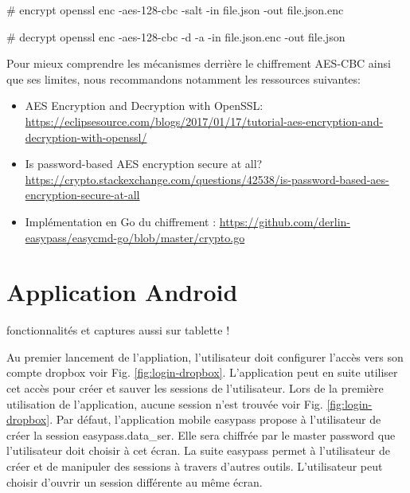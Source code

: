 \begin{bashcode}
# encrypt
openssl enc -aes-128-cbc -salt -in file.json -out file.json.enc  

# decrypt
openssl enc -aes-128-cbc -d -a -in file.json.enc -out file.json 
\end{bashcode}


Pour mieux comprendre les mécanismes derrière le chiffrement AES-CBC ainsi que ses limites, nous recommandons notamment les ressources suivantes:

\begin{itemize}
    \item AES Encryption and Decryption with OpenSSL: \url{https://eclipsesource.com/blogs/2017/01/17/tutorial-aes-encryption-and-decryption-with-openssl/}
    \item Is password-based AES encryption secure at all? \url{https://crypto.stackexchange.com/questions/42538/is-password-based-aes-encryption-secure-at-all}
    \item Implémentation en Go du chiffrement \easypass{}: \url{https://github.com/derlin-easypass/easycmd-go/blob/master/crypto.go}
\end{itemize}

\section{Application Android}

fonctionnalités et captures aussi sur tablette !

Au premier lancement de l'appliation, l'utilisateur doit configurer l'accès vers son compte dropbox voir Fig. \ref{fig:login-dropbox}. L'application peut en suite utiliser cet accès pour créer et sauver les sessions de l'utilisateur. Lors de la première utilisation de l'application, aucune session n'est trouvée voir Fig. \ref{fig:login-dropbox}. Par défaut, l'application mobile easypass propose à l'utilisateur de créer la session easypass.data\_ser. Elle sera chiffrée par le master password que l'utilisateur doit choisir à cet écran. La suite easypass permet à l'utilisateur de créer et de manipuler des sessions à travers d'autres outils. L'utilisateur peut choisir d'ouvrir un session  différente au même écran.

\begin{center}
	\begin{minipage}{.3\textwidth}
	\end{minipage}
	\begin{minipage}{.3\textwidth}
	\end{minipage}
	\begin{minipage}{.3\textwidth}
	\end{minipage}        
\end{center}

